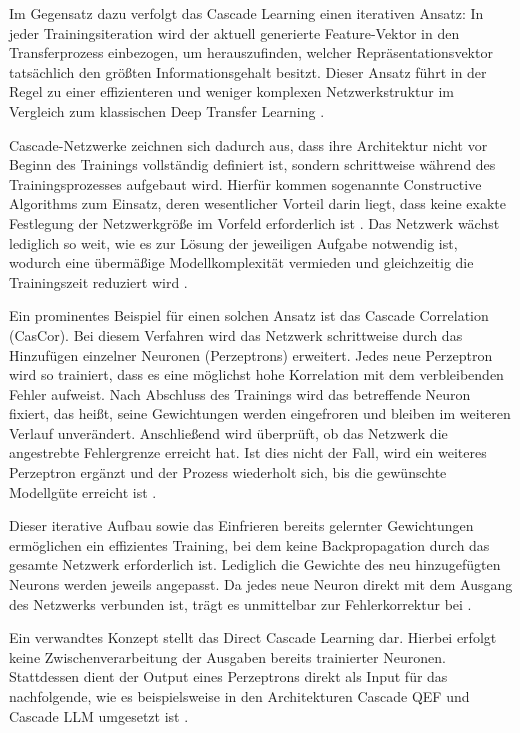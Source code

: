 Im Gegensatz dazu verfolgt das Cascade Learning einen iterativen Ansatz: In jeder Trainingsiteration wird der aktuell generierte Feature-Vektor 
in den Transferprozess einbezogen, um herauszufinden, welcher Repräsentationsvektor tatsächlich den größten Informationsgehalt besitzt. Dieser 
Ansatz führt in der Regel zu einer effizienteren und weniger komplexen Netzwerkstruktur im Vergleich zum klassischen Deep Transfer Learning 
\cite{phd_deep_cascade}.

Cascade-Netzwerke zeichnen sich dadurch aus, dass ihre Architektur nicht vor Beginn des Trainings vollständig definiert ist, sondern 
schrittweise während des Trainingsprozesses aufgebaut wird. Hierfür kommen sogenannte Constructive Algorithms zum Einsatz, deren wesentlicher 
Vorteil darin liegt, dass keine exakte Festlegung der Netzwerkgröße im Vorfeld erforderlich ist \cite{Constructive_Cascade}. Das Netzwerk wächst 
lediglich so weit, wie es zur Lösung der jeweiligen Aufgabe notwendig ist, wodurch eine übermäßige Modellkomplexität vermieden und gleichzeitig 
die Trainingszeit reduziert wird \cite{Constructive_Cascade, cascor}.

Ein prominentes Beispiel für einen solchen Ansatz ist das Cascade Correlation (CasCor). Bei diesem Verfahren wird das Netzwerk schrittweise 
durch das Hinzufügen einzelner Neuronen (Perzeptrons) erweitert. Jedes neue Perzeptron wird so trainiert, dass es eine möglichst hohe 
Korrelation mit dem verbleibenden Fehler aufweist. Nach Abschluss des Trainings wird das betreffende Neuron fixiert, das heißt, seine 
Gewichtungen werden eingefroren und bleiben im weiteren Verlauf unverändert. Anschließend wird überprüft, ob das Netzwerk die angestrebte 
Fehlergrenze erreicht hat. Ist dies nicht der Fall, wird ein weiteres Perzeptron ergänzt und der Prozess wiederholt sich, bis die gewünschte 
Modellgüte erreicht ist \cite{cascor}.

Dieser iterative Aufbau sowie das Einfrieren bereits gelernter Gewichtungen ermöglichen ein effizientes Training, bei dem keine Backpropagation 
durch das gesamte Netzwerk erforderlich ist. Lediglich die Gewichte des neu hinzugefügten Neurons werden jeweils angepasst. Da jedes neue 
Neuron direkt mit dem Ausgang des Netzwerks verbunden ist, trägt es unmittelbar zur Fehlerkorrektur bei \cite{cascor}.

Ein verwandtes Konzept stellt das Direct Cascade Learning dar. Hierbei erfolgt keine Zwischenverarbeitung der Ausgaben bereits trainierter 
Neuronen. Stattdessen dient der Output eines Perzeptrons direkt als Input für das nachfolgende, wie es beispielsweise in den Architekturen 
Cascade QEF und Cascade LLM umgesetzt ist \cite{cascade_network_architectures,cascade_llm_networks}.

